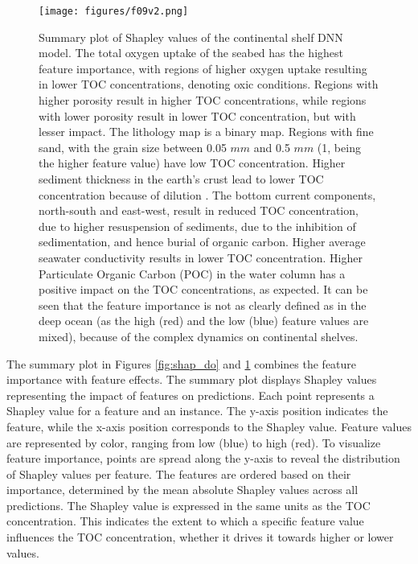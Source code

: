\documentclass[journal abbreviation, manuscript]{copernicus}
\begin{document}
\begin{figure}[!htb]
\texttt{[image: figures/f09v2.png]}
\caption{Summary plot of Shapley values of the continental shelf DNN model. The total oxygen uptake \citep{TOU_JORGENSEN2022} of the seabed has the highest feature importance, with regions of higher oxygen uptake resulting in lower TOC concentrations, denoting oxic conditions. Regions with higher porosity \citep{Martin2005Porosity} result in higher TOC concentrations, while regions with lower porosity result in lower TOC concentration, but with lesser impact. The lithology map is a binary map. Regions with fine sand, with the grain size between 0.05 $mm$ and 0.5 $mm$ (1, being the higher feature value) have low TOC concentration. Higher sediment thickness in the earth’s crust lead to lower TOC concentration because of dilution \citep{Berner1982}. The bottom current components, north-south and east-west, result in reduced TOC concentration, due to higher resuspension of sediments, due to the inhibition of sedimentation, and hence burial of organic carbon. Higher average seawater conductivity results in lower TOC concentration. Higher Particulate Organic Carbon (POC) in the water column has a positive impact on the TOC concentrations, as expected. It can be seen that the feature importance is not as clearly defined as in the deep ocean (as the high (red) and the low (blue) feature values are mixed), because of the complex dynamics on continental shelves.}
\label{fig:shap_cs}
\end{figure}

\clearpage
The summary plot in Figures \ref{fig:shap_do} and \ref{fig:shap_cs} combines the feature importance with feature effects. The summary plot displays Shapley values representing the impact of features on predictions. Each point represents a Shapley value for a feature and an instance. The y-axis position indicates the feature, while the x-axis position corresponds to the Shapley value. Feature values are represented by color, ranging from low (blue) to high (red). To visualize feature importance, points are spread along the y-axis to reveal the distribution of Shapley values per feature. The features are ordered based on their importance, determined by the mean absolute Shapley values across all predictions. The Shapley value is expressed in the same units as the TOC concentration. This indicates the extent to which a specific feature value influences the TOC concentration, whether it drives it towards higher or lower values.
\end{document}
